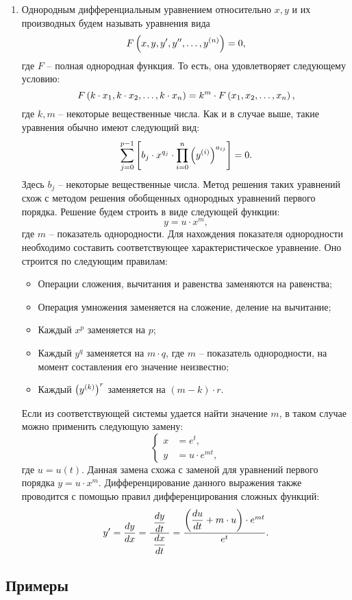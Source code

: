 \begin{enumerate}
		\item Однородным дифференциальным уравнением относительно $x, y$ и их производных будем называть уравнения вида
			\[ F\left( x, y, y', y'', \dots, y^{(n)} \right) = 0, \]
			где $F$ -- полная однородная функция. То есть, она удовлетворяет следующему условию:
			\[ F\left( k \cdot x_1, k \cdot x_2, \dots, k \cdot x_n \right) = k^m \cdot F\left( x_1, x_2, \dots, x_n \right), \]
			где $k, m$ -- некоторые вещественные числа. Как и в случае выше, такие уравнения обычно имеют следующий вид:
			\[ \sum_{j = 0}^{p-1} \left[ b_j \cdot x^{q_j} \cdot \prod_{i=0}^{n} \left( y^{(i)} \right)^{a_{ij}} \right] = 0. \]
			Здесь $b_j$ -- некоторые вещественные числа. Метод решения таких уравнений схож с методом решения обобщенных однородных уравнений первого порядка. Решение будем строить в виде следующей функции:
			\[ y = u \cdot x^m, \]
			где $m$ -- показатель однородности. Для нахождения показателя однородности необходимо составить соответствующее характеристическое уравнение. Оно строится по следующим правилам:
			\begin{itemize}
				\item Операции сложения, вычитания и равенства заменяются на равенства;
				\item Операция умножения заменяется на сложение, деление на вычитание;
				\item Каждый $x^p$ заменяется на $p$;
				\item Каждый $y^q$ заменяется на $m \cdot q$, где $m$ -- показатель однородности, на момент составления его значение неизвестно;
				\item Каждый $\left( y^{(k)} \right)^{r}$ заменяется на $(m - k) \cdot r$.
			\end{itemize}
			Если из соответствующей системы удается найти значение $m$, в таком случае можно применить следующую замену:
			\[ \left\lbrace \begin{split} 
				x &= e^{t}, \\
				y &= u \cdot e^{mt},
			\end{split} \right. \]
			где $u = u(t)$. Данная замена схожа с заменой для уравнений первого порядка $y = u \cdot x^m$. Дифференцирование данного выражения также проводится с помощью правил дифференцирования сложных функций:
			\[ y' = \dfrac{d y}{d x} = \frac{~\dfrac{d y}{d t}~}{~\dfrac{d x}{d t}~} = \frac{\left( \dfrac{d u}{d t} + m \cdot u \right) \cdot e^{mt}}{e^{t}}. \]

	\end{enumerate}

	\subsection{Примеры}

